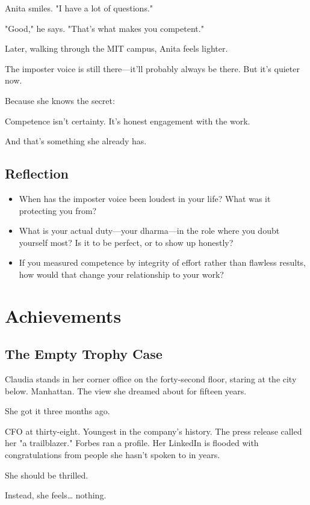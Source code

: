 \documentclass[11pt,twoside]{book}
\begin{document}
Anita smiles. "I have a lot of questions."

"Good," he says. "That's what makes you competent."

Later, walking through the MIT campus, Anita feels lighter.

The imposter voice is still there—it'll probably always be there. But it's quieter now.

Because she knows the secret:

Competence isn't certainty. It's honest engagement with the work.

And that's something she already has.

\section*{Reflection}

\begin{itemize}
\item When has the imposter voice been loudest in your life? What was it protecting you from?
\item What is your actual duty—your dharma—in the role where you doubt yourself most? Is it to be perfect, or to show up honestly?
\item If you measured competence by integrity of effort rather than flawless results, how would that change your relationship to your work?
\end{itemize}

\chapter{Achievements}

\section*{The Empty Trophy Case}

Claudia stands in her corner office on the forty-second floor, staring at the city below. Manhattan. The view she dreamed about for fifteen years.

She got it three months ago.

CFO at thirty-eight. Youngest in the company's history. The press release called her "a trailblazer." Forbes ran a profile. Her LinkedIn is flooded with congratulations from people she hasn't spoken to in years.

She should be thrilled.

Instead, she feels\ldots{} nothing.
\end{document}
